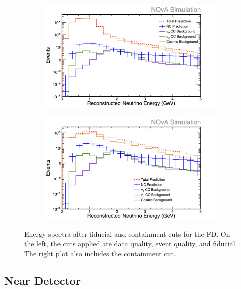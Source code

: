 \begin{figure}[h]
  \centering
  \begin{subfigure}{.48\textwidth}
    \centering
    \includegraphics[width=1\linewidth]{figures/RecoE2FD.png}
  \end{subfigure}
  \begin{subfigure}{.48\textwidth}
    \centering
    \includegraphics[width=1\linewidth]{figures/RecoE3FD.png}
  \end{subfigure}
  \caption[Energy Spectra After Fiducial and Containment Cuts, FD]{Energy spectra after fiducial and containment cuts for the FD. On the left, the cuts applied are data quality, event quality, and fiducial. The right plot also includes the containment cut.}
  \label{fig:NP1FidContFD}
\end{figure}

\subsection{Near Detector}

